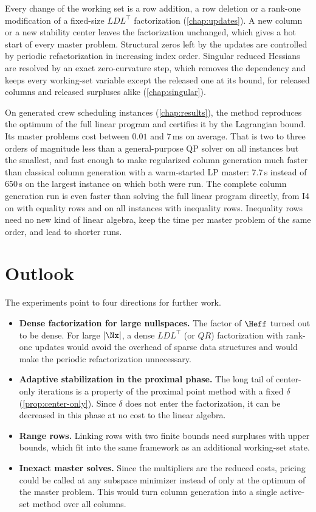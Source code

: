 \medskip

Every change of the working set is a row addition, a row deletion or a rank-one modification
of a fixed-size $LDL^\top$ factorization (\cref{chap:updates}). A new column or a new
stability center leaves the factorization unchanged, which gives a hot start of every master
problem. Structural zeros left by the updates are controlled by periodic refactorization in
increasing index order. Singular reduced Hessians are resolved by an exact zero-curvature
step, which removes the dependency and keeps every working-set variable except the released one at its bound, for
released columns and released surpluses alike (\cref{chap:singular}).

\medskip

On generated crew scheduling instances (\cref{chap:results}), the method reproduces the optimum
of the full linear program and certifies it by the Lagrangian bound. Its master problems cost
between $0.01$ and $7$\,ms on average. That is two to three orders of magnitude less than a
general-purpose QP solver on all instances but the smallest, and fast enough to make regularized column generation much faster
than classical column generation with a warm-started LP master: 7.7\,s instead of 650\,s on
the largest instance on which both were run. The complete column generation run is even
faster than solving the full linear program directly, from I4 on with equality rows and on all
instances with inequality rows. Inequality rows need no new kind of
linear algebra, keep the time per master problem of the same order, and lead to shorter runs.


\section{Outlook}

The experiments point to four directions for further work.
\begin{itemize}
    \item \textbf{Dense factorization for large nullspaces.} The factor of $\Heff$ turned out
          to be dense. For large $|\Nx|$, a dense $LDL^\top$ (or $QR$) factorization with
          rank-one updates would avoid the overhead of sparse data structures and would make
          the periodic refactorization unnecessary.
    \item \textbf{Adaptive stabilization in the proximal phase.} The long tail of center-only
          iterations is a property of the proximal point method with a fixed $\delta$
          (\cref{prop:center-only}). Since $\delta$ does not enter the factorization, it can be
          decreased in this phase at no cost to the linear algebra.
    \item \textbf{Range rows.} Linking rows with two finite bounds need surpluses with upper
          bounds, which fit into the same framework as an additional working-set state.
    \item \textbf{Inexact master solves.} Since the multipliers are the reduced costs, pricing
          could be called at any subspace minimizer instead of only at the optimum of the
          master problem. This would turn column generation into a single active-set method
          over all columns.
\end{itemize}
